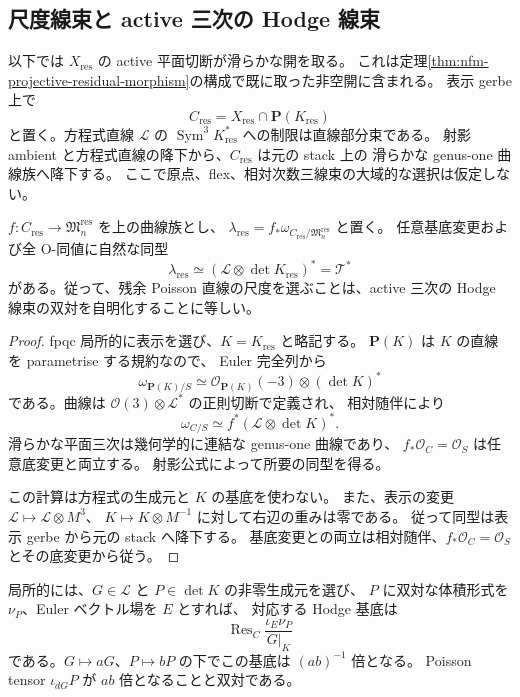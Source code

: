 \subsection{尺度線束と active 三次の Hodge 線束}

以下では $X_{\mathrm{res}}$ の active 平面切断が滑らかな開を取る。
これは定理\ref{thm:nfm-projective-residual-morphism}の構成で既に取った非空開に含まれる。
表示 gerbe 上で
\[
 C_{\mathrm{res}}
   =X_{\mathrm{res}}\cap\mathbf P(K_{\mathrm{res}})
\]
と置く。方程式直線 $\mathcal L$ の
$\operatorname{Sym}^3K_{\mathrm{res}}^*$ への制限は直線部分束である。
射影 ambient と方程式直線の降下から、$C_{\mathrm{res}}$ は元の stack 上の
滑らかな genus-one 曲線族へ降下する。
ここで原点、flex、相対次数三線束の大域的な選択は仮定しない。

\begin{proposition}
\label{prop:nfm-scale-hodge-line}
$f:C_{\mathrm{res}}\to\mathfrak M_n^{\mathrm{res}}$ を上の曲線族とし、
$\lambda_{\mathrm{res}}=f_*\omega_{C_{\mathrm{res}}/\mathfrak M_n^{\mathrm{res}}}$ と置く。
任意基底変更および全 O-同値に自然な同型
\[
 \lambda_{\mathrm{res}}\simeq
 (\mathcal L\otimes\det K_{\mathrm{res}})^*
 =\mathscr T^*
\]
がある。従って、残余 Poisson 直線の尺度を選ぶことは、active 三次の
Hodge 線束の双対を自明化することに等しい。
\end{proposition}

\begin{proof}
fpqc 局所的に表示を選び、$K=K_{\mathrm{res}}$ と略記する。
$\mathbf P(K)$ は $K$ の直線を parametrise する規約なので、
Euler 完全列から
\[
 \omega_{\mathbf P(K)/S}
   \simeq\mathcal O_{\mathbf P(K)}(-3)\otimes(\det K)^*
\]
である。曲線は $\mathcal O(3)\otimes\mathcal L^*$ の正則切断で定義され、
相対随伴により
\[
 \omega_{C/S}\simeq f^*(\mathcal L\otimes\det K)^*.
\]
滑らかな平面三次は幾何学的に連結な genus-one 曲線であり、
$f_*\mathcal O_C=\mathcal O_S$ は任意底変更と両立する。
射影公式によって所要の同型を得る。

この計算は方程式の生成元と $K$ の基底を使わない。
また、表示の変更 $\mathcal L\mapsto\mathcal L\otimes M^3$、
$K\mapsto K\otimes M^{-1}$ に対して右辺の重みは零である。
従って同型は表示 gerbe から元の stack へ降下する。
基底変更との両立は相対随伴、$f_*\mathcal O_C=\mathcal O_S$ とその底変更から従う。
\end{proof}

局所的には、$G\in\mathcal L$ と $P\in\det K$ の非零生成元を選び、
$P$ に双対な体積形式を $\nu_P$、Euler ベクトル場を $E$ とすれば、
対応する Hodge 基底は
\[
 \operatorname{Res}_{C}
       \frac{\iota_E\nu_P}{G|_K}
\]
である。$G\mapsto aG$、$P\mapsto bP$ の下でこの基底は $(ab)^{-1}$ 倍となる。
Poisson tensor $\iota_{dG}P$ が $ab$ 倍となることと双対である。

